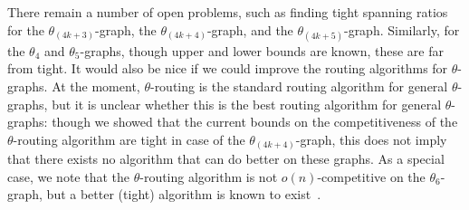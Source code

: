 \documentclass[12pt]{article}
\newcommand{\graph}[1]{\ensuremath{\theta_{(4 k + #1)}}-graph\xspace}
\begin{document}
There remain a number of open problems, such as finding tight spanning ratios for the \graph{3}, the \graph{4}, and the \graph{5}. Similarly, for the $\theta_4$ and $\theta_5$-graphs, though upper and lower bounds are known, these are far from tight. It would also be nice if we could improve the routing algorithms for $\theta$-graphs. At the moment, $\theta$-routing is the standard routing algorithm for general $\theta$-graphs, but it is unclear whether this is the best routing algorithm for general $\theta$-graphs: though we showed that the current bounds on the competitiveness of the $\theta$-routing algorithm are tight in case of the \graph{4}, this does not imply that there exists no algorithm that can do better on these graphs. As a special case, we note that the $\theta$-routing algorithm is not $o(n)$-competitive on the $\theta_6$-graph, but a better (tight) algorithm is known to exist~\cite{BFRV12}. 




\end{document}
